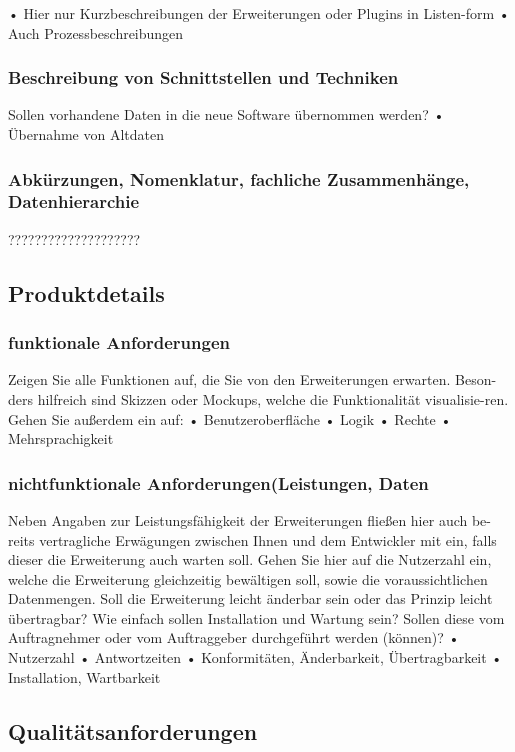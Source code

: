 •	Hier nur Kurzbeschreibungen der Erweiterungen oder Plugins in Listen-form
•	Auch Prozessbeschreibungen

\subsubsection{Beschreibung von Schnittstellen und Techniken}

Sollen vorhandene Daten in die neue Software übernommen werden? 
•	Übernahme von Altdaten 


\subsubsection{Abkürzungen, Nomenklatur, fachliche Zusammenhänge, Datenhierarchie}
????????????????????

\subsection{Produktdetails}

\subsubsection{funktionale Anforderungen}

Zeigen Sie alle Funktionen auf, die Sie von den Erweiterungen erwarten. Beson-ders hilfreich sind Skizzen oder Mockups, welche die Funktionalität visualisie-ren. Gehen Sie außerdem ein auf: 
•	Benutzeroberfläche
•	Logik
•	Rechte
•	Mehrsprachigkeit

\subsubsection{nichtfunktionale Anforderungen(Leistungen, Daten}

Neben Angaben zur Leistungsfähigkeit der Erweiterungen fließen hier auch be-reits vertragliche Erwägungen zwischen Ihnen und dem Entwickler mit ein, falls dieser die Erweiterung auch warten soll. Gehen Sie hier auf die Nutzerzahl ein, welche die Erweiterung gleichzeitig bewältigen soll, sowie die voraussichtlichen Datenmengen. Soll die Erweiterung leicht änderbar sein oder das Prinzip leicht übertragbar? Wie einfach sollen Installation und Wartung sein? Sollen diese vom Auftragnehmer oder vom Auftraggeber durchgeführt werden (können)?
•	Nutzerzahl
•	Antwortzeiten
•	Konformitäten, Änderbarkeit, Übertragbarkeit
•	Installation, Wartbarkeit 


\subsection{Qualitätsanforderungen}


